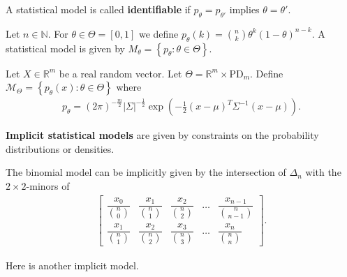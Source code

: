\documentclass[a4paper, 11pt]{article}
\begin{document}
\begin{defi}
  A statistical model is called \textbf{identifiable} if \( p_\theta = p_{\theta '} \) implies \( \theta = \theta' \).
\end{defi}

\begin{eg}
  Let \( n \in \mathbb{N} \). For \( \theta \in \Theta = [0,1] \) we define \( p_\theta(k) = {n \choose k} \theta^k (1 - \theta)^{n - k} \). A statistical model is given by \( M_\theta = \left\{ p_\theta : \theta \in \Theta \right\}  \).
\end{eg}

\begin{eg}
  Let \( X \in \mathbb{R}^m \) be a real random vector. Let \( \Theta = \mathbb{R}^m \times \mathrm{PD}_m \). Define \( \mathcal{M}_\Theta = \left\{ p_\theta (x) : \theta \in \Theta \right\} \) where 
  \begin{align*}
    p_\theta = (2\pi)^{-\frac{m}{2}} |\Sigma|^{-\frac{1}{2}}\exp{\left( -\frac{1}{2} (x - \mu)^T \Sigma^{-1}(x - \mu) \right)}.
  \end{align*}
\end{eg}

\begin{defi}
  \textbf{Implicit statistical models} are given by constraints on the probability distributions or densities.
\end{defi}

\begin{eg}
  The binomial model can be implicitly given by the intersection of \( \Delta_n \) with the \( 2 \times 2 \)-minors of 
  \begin{align*}
    \begin{bmatrix}
      \dfrac{x_0}{{n \choose 0}} & \dfrac{x_1}{{n \choose 1}} & \dfrac{x_2}{{n \choose 2}} & \dots & \dfrac{x_{n-1}}{{n \choose n-1}} \\[1.5em]
      \dfrac{x_1}{{n \choose 1}} & \dfrac{x_2}{{n \choose 2}} & \dfrac{x_3}{{n \choose 3}} & \dots & \dfrac{x_{n}}{{n \choose n}}
    \end{bmatrix}.
  \end{align*}
\end{eg}

Here is another implicit model.
\end{document}
